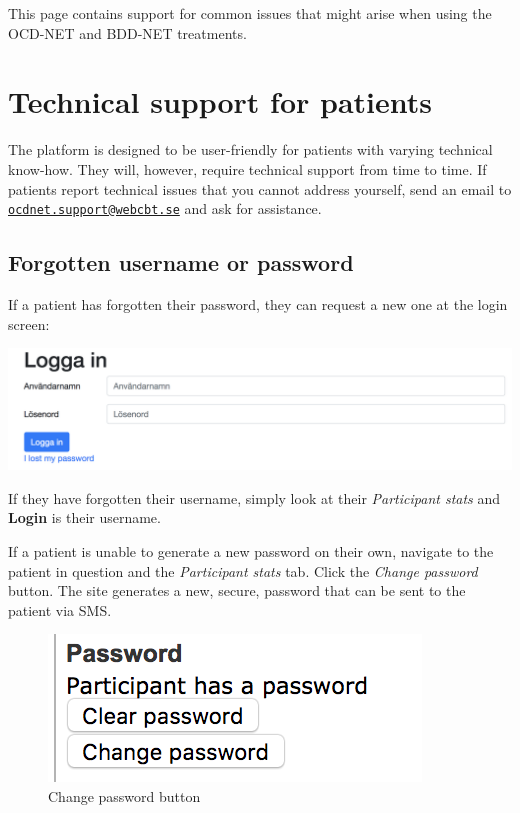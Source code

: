 \documentclass[]{book}
\theoremstyle{definition}
\theoremstyle{definition}
\theoremstyle{definition}
\theoremstyle{remark}
\begin{document}
This page contains support for common issues that might arise when using
the OCD-NET and BDD-NET treatments.

\hypertarget{technical-support-for-patients}{%
\section{Technical support for
patients}\label{technical-support-for-patients}}

The platform is designed to be user-friendly for patients with varying
technical know-how. They will, however, require technical support from
time to time. If patients report technical issues that you cannot
address yourself, send an email to
\href{mailto:ocdnet.support@webcbt.se}{\nolinkurl{ocdnet.support@webcbt.se}}
and ask for assistance.

\hypertarget{forgotten-username-or-password}{%
\subsection{Forgotten username or
password}\label{forgotten-username-or-password}}

If a patient has forgotten their password, they can request a new one at
the login screen:

\includegraphics{images/patient-lost-password.png}

If they have forgotten their username, simply look at their
\emph{Participant stats} and \textbf{Login} is their username.

If a patient is unable to generate a new password on their own, navigate
to the patient in question and the \emph{Participant stats} tab. Click
the \emph{Change password} button. The site generates a new, secure,
password that can be sent to the patient via SMS.

\begin{figure}
\centering
\includegraphics{images/change-password.png}
\caption{Change password button}
\end{figure}
\end{document}
